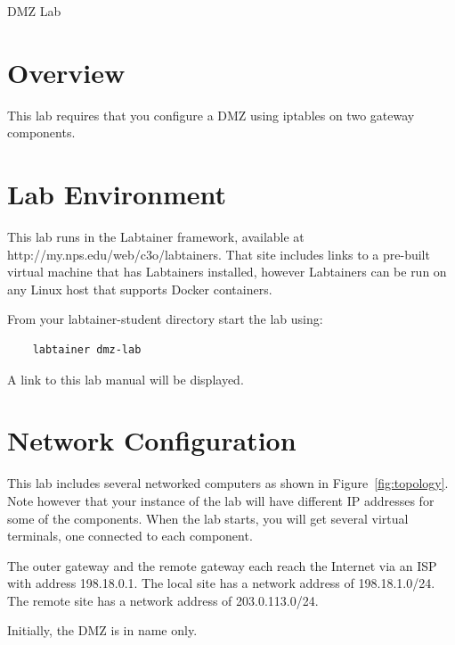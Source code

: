


\begin{center}
{\LARGE DMZ Lab}
\vspace{0.1in}\\
\end{center}

\copyrightnotice

\section{Overview}
This lab requires that you configure a DMZ using iptables on two gateway components.

\section{Lab Environment}
This lab runs in the Labtainer framework,
available at http://my.nps.edu/web/c3o/labtainers.
That site includes links to a pre-built virtual machine
that has Labtainers installed, however Labtainers can
be run on any Linux host that supports Docker containers.

From your labtainer-student directory start the lab using:
\begin{verbatim}
    labtainer dmz-lab
\end{verbatim}
\noindent A link to this lab manual will be displayed.  

\section{Network Configuration}
This lab includes several networked computers as shown in Figure~\ref{fig:topology}.
Note however that your instance of the lab will have different IP addresses
for some of the components.
When the lab starts, you will get several virtual terminals, one connected to each
component.

The outer gateway and the remote gateway each reach the Internet via an ISP with 
address 198.18.0.1.  The local site has a network address of 198.18.1.0/24.  The remote
site has a network address of 203.0.113.0/24.

Initially, the DMZ is in name only.

